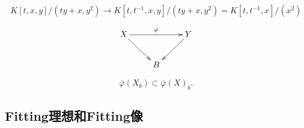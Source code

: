 \[
    K[t, x, y] /\left(t y+x, y^2\right) \rightarrow K\left[t, t^{-1}, x, y\right] /
    \left(t y+x, y^2\right)=K\left[t, t^{-1}, x\right] /\left(x^2\right)
\]

\[
    \xymatrix{
        X\ar[rr]^\varphi\ar[rd]&&Y\ar[ld]\\
        &B&
    }
\]

\[
    \bar{\varphi}\left(X_b\right) \subset \bar{\varphi}(X)_b.
\]


\subsection{Fitting理想和Fitting像}\label{s:5.1.3}